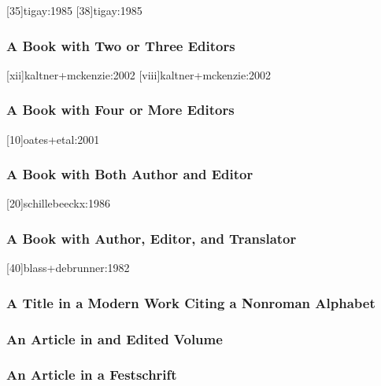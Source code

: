 \documentclass[a4paper]{article}
\begin{document}
[35]{tigay:1985}
[38]{tigay:1985}

\subsubsection{A Book with Two or Three Editors}

[xii]{kaltner+mckenzie:2002}
[viii]{kaltner+mckenzie:2002}

\subsubsection{A Book with Four or More Editors}

[10]{oates+etal:2001}

\subsubsection{A Book with Both Author and Editor}

[20]{schillebeeckx:1986}

\subsubsection{A Book with Author, Editor, and Translator}

[40]{blass+debrunner:1982}

\subsubsection{A Title in a Modern Work Citing a Nonroman Alphabet}


\subsubsection{An Article in and Edited Volume}


\subsubsection{An Article in a Festschrift}
\end{document}
